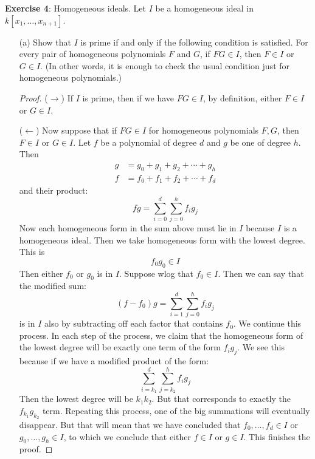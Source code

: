 \documentclass{article}
\begin{document}
\textbf{Exercise 4}: Homogeneous ideals. Let $I$ be a homogeneous ideal in $k[x_{1}, \ldots, x_{n + 1}]$.
    \begin{itemize}
        \item [(a)] Show that $I$ is prime if and only if the following condition is satisfied. For every pair of homogeneous polynomials $F$ and $G$, if $FG \in I$, then $F \in I$ or $G \in I$. (In other words, it is enough to check the usual condition just for homogeneous polynomials.)
            \begin{proof}
                ($\rightarrow$) If $I$ is prime, then if we have $FG \in I$, by definition, either $F \in I$ or $G \in I$. 

                ($\leftarrow$) Now suppose that if $FG \in I$ for homogeneous polynomials $F, G$, then $F \in I$ or $G \in I$. Let $f$ be a polynomial of degree $d$ and $g$ be one of degree $h$. Then
                    \begin{align*}
                        g &= g_{0} + g_{1} + g_{2} + \cdots + g_{h} \\
                        f &= f_{0} + f_{1} + f_{2} + \cdots + f_{d}   
                    \end{align*}
                and their product:
                    \begin{equation*}
                        fg = \sum_{i = 0}^{d}\sum_{j = 0}^{h} f_{i}g_{j}
                    \end{equation*}
                Now each homogeneous form in the sum above must lie in $I$ because $I$ is a homogeneous ideal. Then we take homogeneous form with the lowest degree. This is 
                    \begin{equation*}
                        f_{0}g_{0} \in I
                    \end{equation*}
                Then either $f_{0}$ or $g_{0}$ is in $I$. Suppose wlog that $f_{0} \in I$. Then we can say that the modified sum:
                    \begin{equation*}
                        (f - f_{0})g = \sum_{i = 1}^{d}\sum_{j = 0}^{h}f_{i}g_{j}
                    \end{equation*}
                is in $I$ also by subtracting off each factor that contains $f_{0}$. We continue this process. In each step of the process, we claim that the homogeneous form of the lowest degree will be exactly one term of the form $f_{i}g_{j}$. We see this because if we have a modified product of the form:
                    \begin{equation*}
                        \sum_{i = k_{1}}^{d}\sum_{j = k_{2}}^{h}f_{i}g_{j}
                    \end{equation*}
                Then the lowest degree will be $k_{1}k_{2}$. But that corresponds to exactly the $f_{k_{1}}g_{k_{2}}$ term. Repeating this process, one of the big summations will eventually disappear. But that will mean that we have concluded that $f_{0}, \ldots, f_{d} \in I$ or $g_{0}, \ldots, g_{h} \in I$, to which we conclude that either $f \in I$ or $g \in I$. This finishes the proof.
            \end{proof}


\end{itemize}
\end{document}
